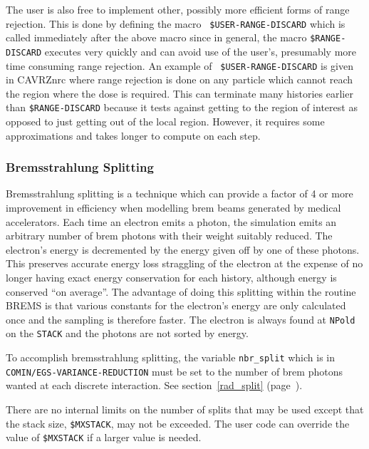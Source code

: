 The user is also free to implement other, possibly more efficient forms of
range rejection. This is done by defining the macro {\tt
\$USER-RANGE-DISCARD} which is called immediately after the above macro
since in general, the macro {\tt \$RANGE-DISCARD} executes very quickly
and can avoid use of the user's, presumably more time consuming range
rejection.  An example of {\tt
\$USER-RANGE-DISCARD} is given in CAVRZnrc where range rejection is done on
any particle which cannot reach the region where the dose is required. This
can terminate many histories earlier than {\tt \$RANGE-DISCARD} because it
tests against getting to the region of interest as opposed to just getting
out of the local region.  However, it requires some approximations and
takes longer to compute on each step.

\subsubsection{Bremsstrahlung Splitting}
\label{brem_splitting}
Bremsstrahlung splitting is a technique which can provide a factor of 4 or
more
improvement in efficiency when modelling brem beams generated
by medical accelerators\cite{Ro95}.  Each time an electron emits a photon,
the simulation emits an arbitrary number of brem photons with
their weight suitably reduced. The electron's energy is decremented by the
energy given off by one of these photons. This preserves accurate
energy loss straggling of the electron at the expense of no longer having
exact energy conservation for each history, although energy is conserved
``on average''.  The advantage of doing this splitting within the routine
BREMS is that various constants for the electron's energy are only
calculated once and the sampling is therefore faster.  The electron is
always found at \verb^NPold^ on the {\tt STACK} and the photons are not sorted by energy.

To accomplish bremsstrahlung  splitting, the variable {\tt nbr\_split} which
is in\\ {\tt COMIN/EGS-VARIANCE-REDUCTION} must be set to the number of
brem photons wanted at each discrete interaction. See
section~\ref{rad_split} (page~\pageref{rad_split}).

There are no internal limits on the number of splits that may be used
except that the stack size, {\tt \$MXSTACK}, may not be exceeded.  The user
code can override the value of {\tt \$MXSTACK} if a larger value is needed.

